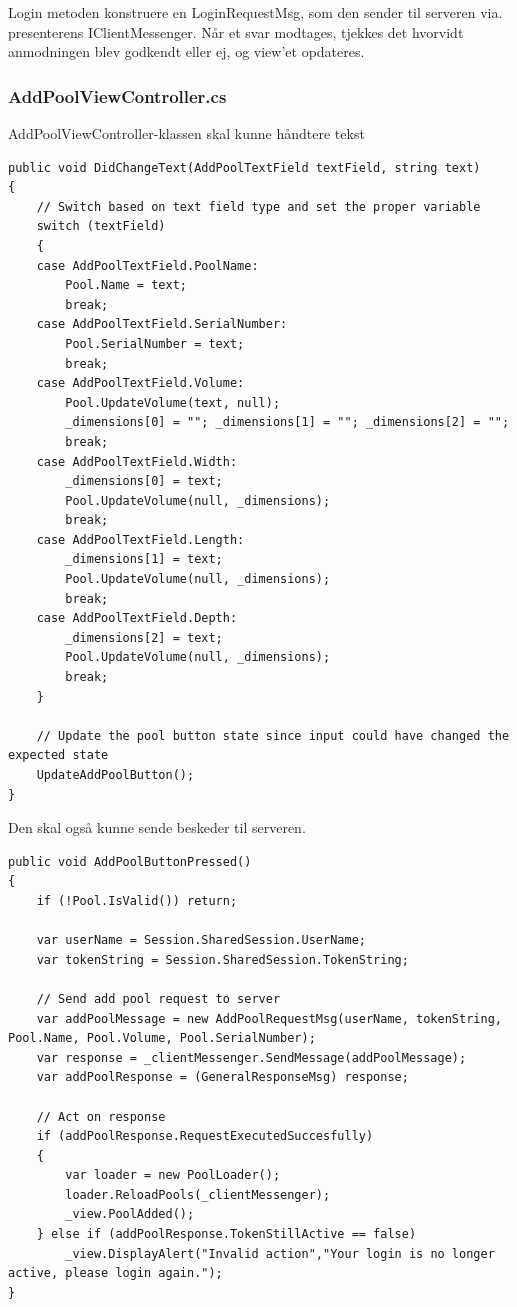 Login metoden konstruere en LoginRequestMsg, som den sender til serveren via. presenterens IClientMessenger. Når et svar modtages, tjekkes det hvorvidt anmodningen blev godkendt eller ej, og view'et opdateres.

\subsubsection{AddPoolViewController.cs}
AddPoolViewController-klassen skal kunne håndtere tekst

\begin{lstlisting}[caption={DidChangeText(...)},label={code:application_impl_apvcdct}]
public void DidChangeText(AddPoolTextField textField, string text)
{
	// Switch based on text field type and set the proper variable
	switch (textField)
	{
	case AddPoolTextField.PoolName:
		Pool.Name = text;
		break;
	case AddPoolTextField.SerialNumber:
		Pool.SerialNumber = text;
		break;
	case AddPoolTextField.Volume:
		Pool.UpdateVolume(text, null);
		_dimensions[0] = ""; _dimensions[1] = ""; _dimensions[2] = "";
		break;
	case AddPoolTextField.Width:
		_dimensions[0] = text;
		Pool.UpdateVolume(null, _dimensions);
		break;
	case AddPoolTextField.Length:
		_dimensions[1] = text;
		Pool.UpdateVolume(null, _dimensions);
		break;
	case AddPoolTextField.Depth:
		_dimensions[2] = text;
		Pool.UpdateVolume(null, _dimensions);
		break;
	}

	// Update the pool button state since input could have changed the expected state
	UpdateAddPoolButton();
}
\end{lstlisting}

Den skal også kunne sende beskeder til serveren.

\begin{lstlisting}[caption={DidChangeText(...)},label={code:application_impl_lvcdcet}]
public void AddPoolButtonPressed()
{
	if (!Pool.IsValid()) return;

	var userName = Session.SharedSession.UserName;
	var tokenString = Session.SharedSession.TokenString;

	// Send add pool request to server
	var addPoolMessage = new AddPoolRequestMsg(userName, tokenString, Pool.Name, Pool.Volume, Pool.SerialNumber);
	var response = _clientMessenger.SendMessage(addPoolMessage);
	var addPoolResponse = (GeneralResponseMsg) response;

	// Act on response
	if (addPoolResponse.RequestExecutedSuccesfully)
	{
		var loader = new PoolLoader();
		loader.ReloadPools(_clientMessenger);
		_view.PoolAdded();
	} else if (addPoolResponse.TokenStillActive == false)
		_view.DisplayAlert("Invalid action","Your login is no longer active, please login again.");
}
\end{lstlisting}

